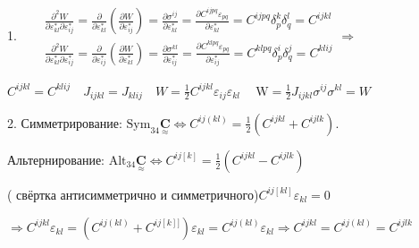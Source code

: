  
 1.$\quad
 \begin{aligned} & \frac{\partial^2 W}{\partial \varepsilon_{k l}^* \partial \varepsilon_{i j}^*}=\frac{\partial}{\partial \varepsilon_{k l}^*}\left(\frac{\partial W}{\partial \varepsilon_{i j}^*}\right)=\frac{\partial \sigma^{i j}}{\partial \varepsilon_{k l}^*}=\frac{\partial C^{i j p q} \varepsilon_{p q}}{\partial \varepsilon_{k l}^*}=C^{i j p q} \delta_p^k \delta_q^l=C^{i j k l} \\ & \frac{\partial^2 W}{\partial \varepsilon_{k l}^* \partial \varepsilon_{i j}^*}=\frac{\partial}{\partial \varepsilon_{i j}^*}\left(\frac{\partial W}{\partial \varepsilon_{k l}^*}\right)=\frac{\partial \sigma^{k l}}{\partial \varepsilon_{i j}^*}=\frac{\partial C^{k l p q} \varepsilon_{p q}}{\partial \varepsilon_{i j}^*}=C^{k l p q} \delta_p^i \delta_q^j=C^{k l i j}\end{aligned} \Rightarrow$

 
 $ C^{i j k l}=C^{k l i j} \quad J_{i j k l}=J_{k l i j} \quad W=\frac{1}{2} C^{i j k l} \varepsilon_{i j} \varepsilon_{k l} \quad \mathrm{~W}=\frac{1}{2} J_{i j k l} \sigma^{i j} \sigma^{k l}=W $

2. Симметрирование: $\mathrm{Sym}_{34} \underset{\approx}{\mathbf{C}} \Leftrightarrow C^{i j(k l)}=\frac{1}{2}\left(C^{i j k l}+C^{i j l k}\right)$. 

Альтернирование: $\mathrm{Alt}_{34} \underset{\approx}{\mathbf{C}} \Leftrightarrow C^{i j[k]}=\frac{1}{2}\left(C^{i j k l}-C^{i j l k}\right)$

( свёртка антисимметрично и симметричного)$C^{i j[k l]} \varepsilon_{k l}=0$


 $\Rightarrow C^{i j k l} \varepsilon_{k l}=\left(C^{i j(k l)}+C^{i j[k]]}\right) \varepsilon_{k l}=C^{i j(k l)} \varepsilon_{k l} \Rightarrow C^{i j k l}=C^{i j(k l)}=C^{i j l k}$

